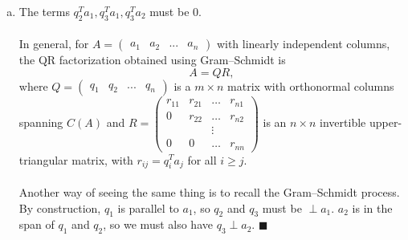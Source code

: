 \documentclass[12pt]{article}
\begin{document}
\begin{enumerate}[1.]
\begin{enumerate}[(a)]
        
        \item The terms $\boxed{q_2^T a_1,  q_3^T a_1, q_3^T a_2}$ must be 0. \\
        \\
        In general, for $A = \begin{pmatrix} a_1 & a_2 & ... & a_n \end{pmatrix}$ with linearly independent columns, the QR factorization obtained using Gram--Schmidt is $$A = QR,$$ where $Q = \begin{pmatrix} q_1 & q_2 & ... & q_n \end{pmatrix}$ is a $m\times n$ matrix with orthonormal columns spanning $C(A)$ and $R = \begin{pmatrix} r_{11} & r_{21} & \dots & r_{n1} \\ 0 & r_{22} & \dots & r_{n2} \\ & & \vdots & \\ 0 & 0 & \dots & r_{nn}\end{pmatrix}$ is an $n \times n$ invertible upper-triangular matrix, with $r_{ij} = q_i^T a_j$ for all $i \geq j$.\\
        \\
        Another way of seeing the same thing is to recall the Gram--Schmidt process.  By construction, $q_1$ is parallel to $a_1$, so $q_2$ and $q_3$ must be $\perp a_1$.  $a_2$ is in the span of $q_1$ and $q_2$, so we must also have $q_3 \perp a_2$.  \hfill $\blacksquare$
    \end{enumerate}
    

\end{enumerate}
\end{document}
